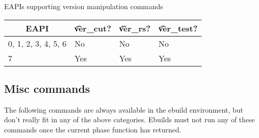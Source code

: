 \begin{centertable}{EAPIs supporting version manipulation commands}
    \label{tab:version-commands}
    \begin{tabular}{llll}
      \toprule
      \multicolumn{1}{c}{\textbf{EAPI}} &
      \multicolumn{1}{c}{\textbf{\t{ver_cut}?}} &
      \multicolumn{1}{c}{\textbf{\t{ver_rs}?}} &
      \multicolumn{1}{c}{\textbf{\t{ver_test}?}} \\
      \midrule
      0, 1, 2, 3, 4, 5, 6 & No  & No  & No  \\
      7                   & Yes & Yes & Yes \\
      \bottomrule
    \end{tabular}
\end{centertable}

\subsection{Misc commands}
The following commands are always available in the ebuild environment, but don't really fit in any
of the above categories. Ebuilds must not run any of these commands once the current phase function
has returned.


